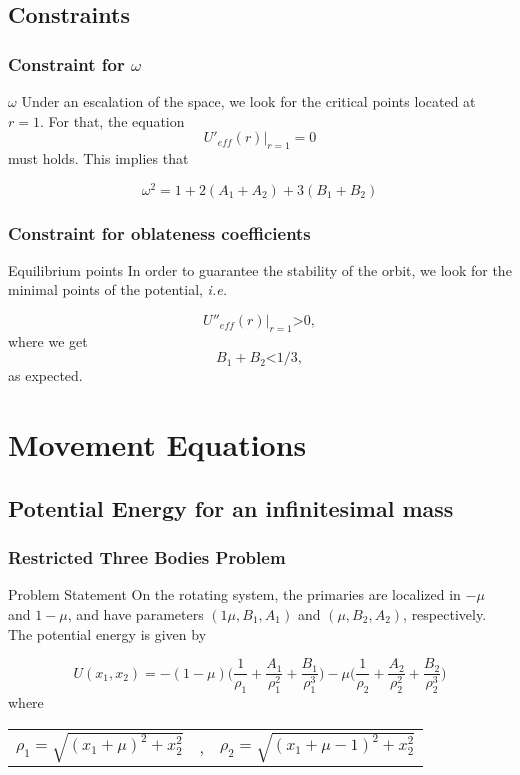 \documentclass{beamer}
\begin{document}
	\subsection{Constraints}
	\begin{frame}
	\frametitle{Constraint for $\omega$}
	\begin{block}{$\omega$}
	Under an escalation of the space, we look for the critical points located at $r=1$. For that, the equation
	$$U'_{eff}(r)|_{r=1}=0$$
	must holds. This implies that
	
	\begin{equation}
	\omega^2=1+2(A_1+A_2)+3(B_1+B_2)
	\end{equation}
	\end{block}
	\end{frame}
	
	\begin{frame}
	\frametitle{Constraint for oblateness coefficients}
	\begin{block}{Equilibrium points}
	In order to guarantee the stability of the orbit, we look for the minimal points of the potential, \textit{i.e.}
	
	$$U''_{eff}(r)|_{r=1}\text{>}0,$$
	where we get
	\begin{equation}
	B_1+B_2 \text{<}1/3,
	\end{equation}
	as expected\cite{alexander}.
	\end{block}
	\end{frame}
	
	\section{Movement Equations}
	\subsection{Potential Energy for an infinitesimal mass}
	
	\begin{frame}
	\frametitle{Restricted Three Bodies Problem}
	\begin{block}{Problem Statement}
	On the rotating system, the primaries are localized in $-\mu$ and $1-\mu$, and have parameters $(1\mu,B_1,A_1)$ and $(\mu,B_2,A_2)$, respectively\cite{MeyerHamilton}. The potential energy is given by
	
	\begin{equation}
	U(x_1,x_2)=-(1-\mu)\Big( \frac{1}{\rho_1}+\frac{A_1}{\rho_1^2}+\frac{B_1}{\rho_1^3}\Big)-\mu\Big( \frac{1}{\rho_2}+\frac{A_2}{\rho_2^2}+\frac{B_2}{\rho_2^3}\Big)
	\end{equation}
	where
	\begin{center}
	\begin{tabular}{ccc}
	$\rho_1=\sqrt{(x_1+\mu)^2+x_2^2}$& , & $\rho_2=\sqrt{(x_1+\mu-1)^2+x_2^2}$
	\end{tabular}
	\end{center}
	\end{block}
	\end{frame}
	
\end{document}
